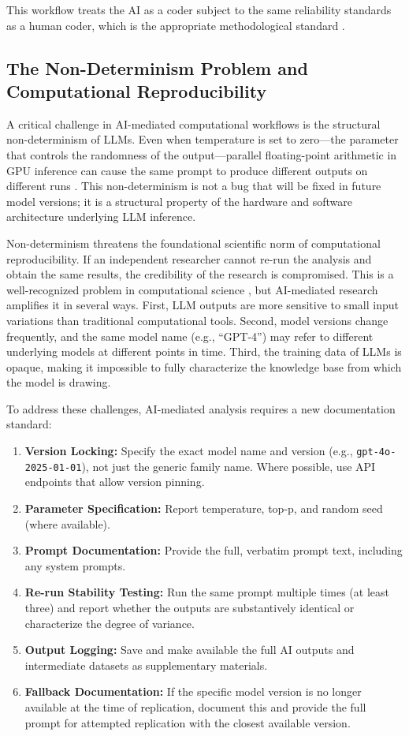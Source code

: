 \documentclass[12pt, a4paper]{article}
\begin{document}
This workflow treats the AI as a coder subject to the same reliability standards as a human coder, which is the appropriate methodological standard \citep{grimmer2022text}.

\subsection{The Non-Determinism Problem and Computational Reproducibility}

A critical challenge in AI-mediated computational workflows is the structural non-determinism of LLMs. Even when temperature is set to zero---the parameter that controls the randomness of the output---parallel floating-point arithmetic in GPU inference can cause the same prompt to produce different outputs on different runs \citep{ouyang2025empirical, rover2026same}. This non-determinism is not a bug that will be fixed in future model versions; it is a structural property of the hardware and software architecture underlying LLM inference.

Non-determinism threatens the foundational scientific norm of computational reproducibility. If an independent researcher cannot re-run the analysis and obtain the same results, the credibility of the research is compromised. This is a well-recognized problem in computational science \citep{kosch2024risk}, but AI-mediated research amplifies it in several ways. First, LLM outputs are more sensitive to small input variations than traditional computational tools. Second, model versions change frequently, and the same model name (e.g., ``GPT-4'') may refer to different underlying models at different points in time. Third, the training data of LLMs is opaque, making it impossible to fully characterize the knowledge base from which the model is drawing.

To address these challenges, AI-mediated analysis requires a new documentation standard:

\begin{enumerate}
    \item \textbf{Version Locking:} Specify the exact model name and version (e.g., \texttt{gpt-4o-2025-01-01}), not just the generic family name. Where possible, use API endpoints that allow version pinning.
    \item \textbf{Parameter Specification:} Report temperature, top-p, and random seed (where available).
    \item \textbf{Prompt Documentation:} Provide the full, verbatim prompt text, including any system prompts.
    \item \textbf{Re-run Stability Testing:} Run the same prompt multiple times (at least three) and report whether the outputs are substantively identical or characterize the degree of variance.
    \item \textbf{Output Logging:} Save and make available the full AI outputs and intermediate datasets as supplementary materials.
    \item \textbf{Fallback Documentation:} If the specific model version is no longer available at the time of replication, document this and provide the full prompt for attempted replication with the closest available version.
\end{enumerate}
\end{document}
